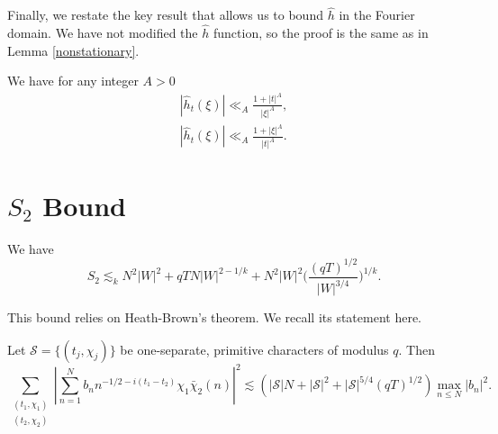 Finally, we restate the key result that allows us to bound $\hat{h}$ in the Fourier domain. We have not modified the $\hat{h}$ function, so the proof is the same as in Lemma \ref{nonstationary}.
\begin{lemma*}
    \label{nonstationarynew}
    We have for any integer $A>0$\begin{align*}
        |\hat{h}_t(\xi)|\ll_A \frac{1+|t|^A}{|\xi|^A},\\
        |\hat{h}_t(\xi)|\ll_A \frac{1+|\xi|^A}{|t|^A}. 
    \end{align*}
\end{lemma*}
\section{$S_2$ Bound}

\begin{proposition}[Bound on $S_2$]\label{s2bound}
    We have \[
    S_2 \lesssim_k N^2|W|^2 + qTN|W|^{2-1/k} + N^2|W|^2 \Big(\frac{(qT)^{1/2}}{|W|^{3/4}}\Big)^{1/k}.
    \]
\end{proposition}
This bound relies on Heath-Brown's theorem. We recall its statement here.
\begin{theorem*}
	Let $\mathcal{S}=\{(t_j,\chi_j)\}$ be one-separate, primitive characters of modulus $q$. Then 
	\[
	\sum_{\substack{(t_1,\chi_1)\\(t_2,\chi_2)}}\left|\sum_{n=1}^{N} b_n n^{-1/2 -i(t_1-t_2)}\chi_1\bar{\chi}_2(n)\right|^2 \lesssim  (|\mathcal{S}|N+ |\mathcal{S}|^2 + |\mathcal{S}|^{5/4}(qT)^{1/2}) \max_{n\leq N} |b_n|^2.
	\]
\end{theorem*}

